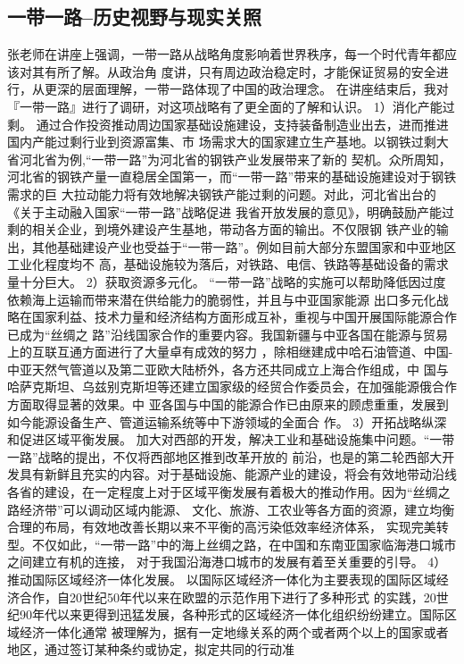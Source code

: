 \documentclass[a4paper]{cctart}
\numberwithin{equation}{section} \pagestyle{fancy}
\begin{document}
\subsection{一带一路--历史视野与现实关照}
张老师在讲座上强调，一带一路从战略角度影响着世界秩序，每一个时代青年都应该对其有所了解。从政治角
度讲，只有周边政治稳定时，才能保证贸易的安全进行，从更深的层面理解，一带一路体现了中国的政治理念。
在讲座结束后，我对『一带一路』进行了调研，对这项战略有了更全面的了解和认识。
1）消化产能过剩。
通过合作投资推动周边国家基础设施建设，支持装备制造业出去，进而推进国内产能过剩行业到资源富集、市
场需求大的国家建立生产基地。以钢铁过剩大省河北省为例,“一带一路”为河北省的钢铁产业发展带来了新的
契机。众所周知，河北省的钢铁产量一直稳居全国第一，而“一带一路”带来的基础设施建设对于钢铁需求的巨
大拉动能力将有效地解决钢铁产能过剩的问题。对此，河北省出台的《关于主动融入国家“一带一路”战略促进
我省开放发展的意见》，明确鼓励产能过剩的相关企业，到境外建设产生基地，带动各方面的输出。不仅限钢
铁产业的输出，其他基础建设产业也受益于“一带一路”。例如目前大部分东盟国家和中亚地区工业化程度均不
高，基础设施较为落后，对铁路、电信、铁路等基础设备的需求量十分巨大。
2）获取资源多元化。
“一带一路”战略的实施可以帮助降低因过度依赖海上运输而带来潜在供给能力的脆弱性，并且与中亚国家能源
出口多元化战略在国家利益、技术力量和经济结构方面形成互补，重视与中国开展国际能源合作已成为“丝绸之
路”沿线国家合作的重要内容。我国新疆与中亚各国在能源与贸易上的互联互通方面进行了大量卓有成效的努力
，除相继建成中哈石油管道、中国-中亚天然气管道以及第二亚欧大陆桥外，各方还共同成立上海合作组成，中
国与哈萨克斯坦、乌兹别克斯坦等还建立国家级的经贸合作委员会，在加强能源俄合作方面取得显著的效果。中
亚各国与中国的能源合作已由原来的顾虑重重，发展到如今能源设备生产、管道运输系统等中下游领域的全面合
作。
3）开拓战略纵深和促进区域平衡发展。
加大对西部的开发，解决工业和基础设施集中问题。“一带一路”战略的提出，不仅将西部地区推到改革开放的
前沿，也是的第二轮西部大开发具有新鲜且充实的内容。对于基础设施、能源产业的建设，将会有效地带动沿线
各省的建设，在一定程度上对于区域平衡发展有着极大的推动作用。因为“丝绸之路经济带”可以调动区域内能源、
文化、旅游、工农业等各方面的资源，建立均衡合理的布局，有效地改善长期以来不平衡的高污染低效率经济体系，
实现完美转型。不仅如此，“一带一路”中的海上丝绸之路，在中国和东南亚国家临海港口城市之间建立有机的连接，
对于我国沿海港口城市的发展有着至关重要的引导。 
4）推动国际区域经济一体化发展。
以国际区域经济一体化为主要表现的国际区域经济合作，自20世纪50年代以来在欧盟的示范作用下进行了多种形式
的实践，20世纪90年代以来更得到迅猛发展，各种形式的区域经济一体化组织纷纷建立。国际区域经济一体化通常
被理解为，据有一定地缘关系的两个或者两个以上的国家或者地区，通过签订某种条约或协定，拟定共同的行动准
\end{document}

